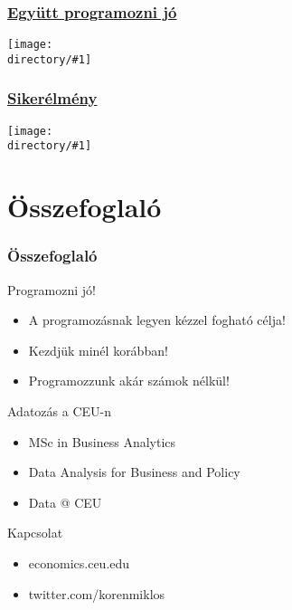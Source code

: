 \documentclass[aspectratio=169,compress,mathserif]{beamer}
\newcommand{\directory}{./exhibits}
\newcommand{\longfigure}[2]{\begin{frame}\frametitle{\hyperlink{#1back}{#2}}\hypertarget{#1}{{\begin{center}\texttt{[image: \\directory/\#1]}\end{center}}}\end{frame}}
\begin{document}
\longfigure{mosoly}{Együtt programozni jó}
\longfigure{codebug}{Sikerélmény}








\section{Összefoglaló}\hypertarget{Összefoglaló}{}
\begin{frame}\frametitle{Összefoglaló}\hypertarget{Összefoglaló}{}
\begin{block}{Programozni jó!}\hypertarget{Programozni jó!}{}
\begin{itemize}
\item A programozásnak legyen kézzel fogható célja!

\item Kezdjük minél korábban!

\item Programozzunk akár számok nélkül!


\end{itemize}
\end{block}
\begin{block}{Adatozás a CEU-n}\hypertarget{Adatozás a CEU-n}{}
\begin{itemize}
\item MSc in Business Analytics

\item Data Analysis for Business and Policy

\item Data @ CEU


\end{itemize}
\end{block}
\begin{block}{Kapcsolat}\hypertarget{Kapcsolat}{}
\begin{itemize}
\item economics.ceu.edu

\item twitter.com/korenmiklos


\end{itemize}
\end{block}
\end{frame}
\end{document}
